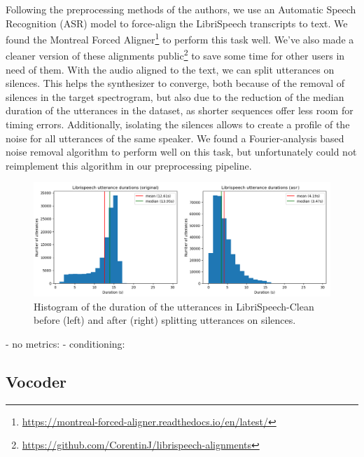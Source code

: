 \documentclass[a4paper, oneside, 12pt, english]{article}
\begin{document}
Following the preprocessing methods of the authors, we use an Automatic Speech Recognition (ASR) model to force-align the LibriSpeech transcripts to text. We found the Montreal Forced Aligner\footnote{\url{https://montreal-forced-aligner.readthedocs.io/en/latest/}} to perform this task well. We've also made a cleaner version of these alignments public\footnote{\url{https://github.com/CorentinJ/librispeech-alignments}} to save some time for other users in need of them. With the audio aligned to the text, we can split utterances on silences. This helps the synthesizer to converge, both because of the removal of silences in the target spectrogram, but also due to the reduction of the median duration of the utterances in the dataset, as shorter sequences offer less room for timing errors. Additionally, isolating the silences allows to create a profile of the noise for all utterances of the same speaker. We found a Fourier-analysis based noise removal algorithm to perform well on this task, but unfortunately could not reimplement this algorithm in our preprocessing pipeline.

\begin{figure}[h]
	\centering
	\includegraphics[width=\linewidth]{images/librispeech_durations.png}
	\caption{Histogram of the duration of the utterances in LibriSpeech-Clean before (left) and after (right) splitting utterances on silences.}
	\label{librispeech_durations}
\end{figure}

- no metrics:
- conditioning:

\subsection{Vocoder} \label{vocoder}
\end{document}
